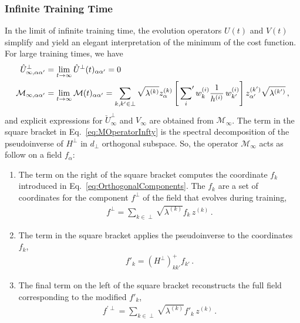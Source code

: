 \subsubsection{Infinite Training Time}
In the limit of infinite training time, the evolution operators $U(t)$ and
$V(t)$ simplify and yield an elegant interpretation of the minimum of the cost
function. For large training times, we have
\begin{align}
    \label{eq:UhatInfty}
    \hat{U}^\perp_{\infty, \alpha\alpha'}
        &= \lim_{t\to\infty}\hat{U}^\perp(t)_{\alpha\alpha'} = 0\, \\
    \label{eq:MOperatorInfty}
    \mathcal{M}_{\infty, \alpha\alpha'} 
        &= \lim_{t\to\infty}\mathcal{M}(t)_{\alpha\alpha'} = \sum_{k,k'\in\perp} \sqrt{\lambda^{(k)}} z^{(k)}_\alpha 
        \left[\sideset{}{'}\sum_{i} w^{(i)}_{k} \frac{1}{h^{(i)}}\, 
        w^{(i)}_{k'}\right] z^{(k')}_{\alpha'} \sqrt{\lambda^{(k')}}\, ,
\end{align}
and explicit expressions for $\check{U}^\perp_{\infty}$ and $V_{\infty}$ are
obtained from $\mathcal{M}_{\infty}$. The term in the square bracket in
Eq.~\eqref{eq:MOperatorInfty} is the spectral decomposition of the pseudoinverse
of $H^\perp$ in $d_\perp$ orthogonal subspace. So, the operator
$\mathcal{M}_{\infty}$ acts as follow on a field $f_{\alpha}$:
\begin{enumerate}
    \item The term on the right of the square bracket computes the coordinate
    $f_k$ introduced in Eq.~\eqref{eq:OrthogonalComponents}. The $f_k$ are a set
    of coordinates for the component $f^\perp$ of the field that evolves during
    training, 
    \begin{align}
        \label{eq:RightOfTheBracket}
        f^\perp = \sum_{k\in\perp} \sqrt{\lambda^{(k)}} f_k\, z^{(k)}\,  .
    \end{align}
    \item The term in the square bracket applies the pseudoinverse to the
    coordinates $f_k$, 
    \begin{align}
        \label{eq:ApplyPseudoInv}
        f'_k = \left(H^\perp\right)^+_{kk'} f_{k'}\, .
    \end{align}
    \item The final term on the left of the square bracket reconstructs the full
    field corresponding to the modified $f'_{k}$,
    \begin{align}
        \label{eq:LeftOfTheBracket}
        f^{'\perp} = \sum_{k\in\perp} \sqrt{\lambda^{(k)}} f'_{k}\, z^{(k)}\, .
    \end{align}
    
\end{enumerate}

